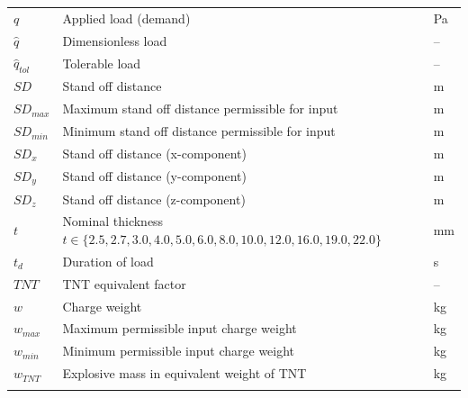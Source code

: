 \documentclass[12pt]{article}
\begin{document}
\begin{longtabu}{l X[l] l}
\\
$q$ & Applied load (demand) & Pa
\\
$\hat{q}$ & Dimensionless load & --
\\
${\hat{q}_{tol}}$ & Tolerable load & --
\\
$SD$ & Stand off distance & m
\\
${SD_{max}}$ & Maximum stand off distance permissible for input & m
\\
${SD_{min}}$ & Minimum stand off distance permissible for input & m
\\
${SD_{x}}$ & Stand off distance (x-component) & m
\\
${SD_{y}}$ & Stand off distance (y-component) & m
\\
${SD_{z}}$ & Stand off distance (z-component) & m
\\
$t$ & Nominal thickness $t\in{}\{2.5,2.7,3.0,4.0,5.0,6.0,8.0,10.0,12.0,16.0,19.0,22.0\}$ & mm
\\
${t_{d}}$ & Duration of load & s
\\
$TNT$ & TNT equivalent factor & --
\\
$w$ & Charge weight & kg
\\
${w_{max}}$ & Maximum permissible input charge weight & kg
\\
${w_{min}}$ & Minimum permissible input charge weight & kg
\\
${w_{TNT}}$ & Explosive mass in equivalent weight of TNT & kg
\\
\bottomrule
\label{Table:ToS}
\end{longtabu}
\end{document}
